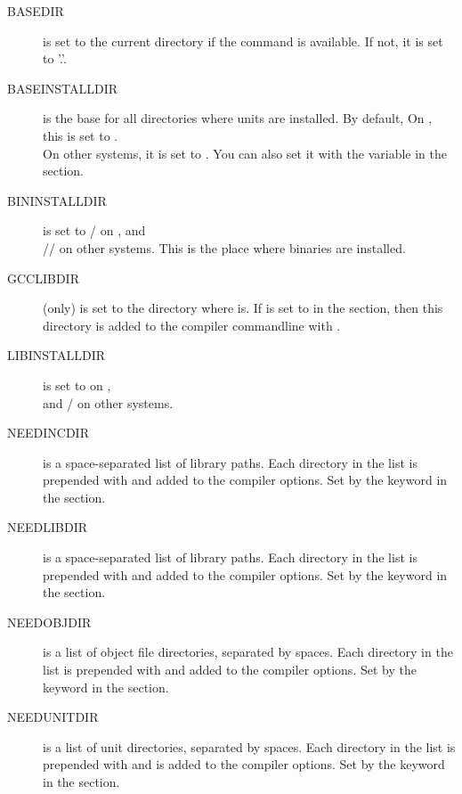 \begin{description}
\item[BASEDIR] is set to the current directory if the  command is
available. If not, it is set to '.'.

\item[BASEINSTALLDIR] is the base for all directories where units are
installed. By default, On \linux, this is set to
.\\ On other systems,
it is set to . You can also set it with the
 variable in the  section.

\item[BININSTALLDIR] is set to / on \linux,
and\\ // on other systems.
This is the place where binaries are installed.

\item[GCCLIBDIR] (\linux only) is set to the directory where 
is. If  is set to  in the  section, then
this directory is added to the compiler commandline with .

\item[LIBINSTALLDIR] is set to  on \linux,\\
 and / on other systems.

\item[NEEDINCDIR] is a space-separated list of library paths. Each
directory in the list is prepended with  and added to the
compiler options. Set by the  keyword in the  section.

\item[NEEDLIBDIR] is a space-separated list of library paths. Each
directory in the list is
prepended with  and added to the compiler options.
Set by the  keyword in the  section.

\item[NEEDOBJDIR] is a list of object file directories, separated by
 spaces. Each directory in the list is prepended with  and
added to the compiler options.
Set by the  keyword in the  section.

\item[NEEDUNITDIR] is a list of unit directories, separated by spaces.
Each directory in the list is prepended with  and is added to the
compiler options.
Set by the  keyword in the  section.


\end{description}
